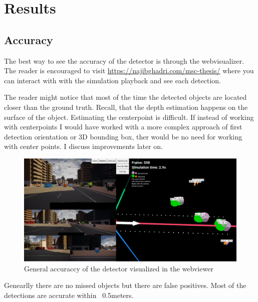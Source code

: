 \chapter{Results}
\label{chap:results}

\section{Accuracy}
The best way to see the accuracy of the detector is through the webvisualizer.
The reader is encouraged to visit \url{https://najibghadri.com/msc-thesis/}
where you can interact with with the simulation playback and see each detection.

The reader might notice that most of the time the detected objects are located
closer than the ground truth. Recall, that the depth estimation happens on the
surface of the object. Estimating the centerpoint is difficult. If instead of
working with centerpoints I would have worked with a more complex approach of
first detection orientation or 3D bounding box, ther would be no need for
working with center points. I discuss improvements later on.

\begin{figure}[!ht]
	\centering
	\includegraphics[width=150mm, keepaspectratio]{figures/accuracy.png}
	\caption{General accuraccy of the detector visualized in the webviewer}
	\label{fig:accuracy}
\end{figure}

Genearlly there are no missed objects but there are false positives. Most of the
detections are accurate within ~0.5meters. 

